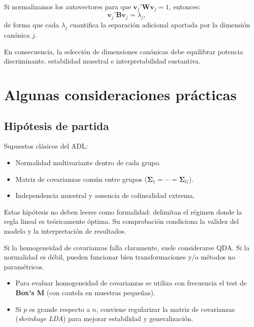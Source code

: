 \documentclass[12pt, a4paper]{article}
\theoremstyle{plain}
\theoremstyle{definition}
\theoremstyle{remark}
\newcommand{\mat}[1]{\mathbf{#1}}
\begin{document}
Si normalizamos los autovectores para que
$\mathbf{v}_j'\mat{W}\mathbf{v}_j=1$, entonces:
\[
  \mathbf{v}_j'\mat{B}\mathbf{v}_j=\lambda_j,
\]
de forma que cada $\lambda_j$ cuantifica la separación adicional aportada
por la dimensión canónica $j$.

En consecuencia, la selección de dimensiones canónicas debe equilibrar potencia
discriminante, estabilidad muestral e interpretabilidad sustantiva.

\section{Algunas consideraciones prácticas}

\subsection{Hipótesis de partida}

Supuestos clásicos del ADL:
\begin{itemize}
  \item Normalidad multivariante dentro de cada grupo.
  \item Matriz de covarianzas común entre grupos
        ($\boldsymbol{\Sigma}_1=\cdots=\boldsymbol{\Sigma}_G$).
  \item Independencia muestral y ausencia de colinealidad extrema.
\end{itemize}

Estas hipótesis no deben leerse como formalidad: delimitan el régimen donde la
regla lineal es teóricamente óptima. Su comprobación condiciona la validez del
modelo y la interpretación de resultados.

Si la homogeneidad de covarianzas falla claramente, suele considerarse QDA.
Si la normalidad es débil, pueden funcionar bien transformaciones y/o métodos
no paramétricos.

\begin{itemize}
  \item Para evaluar homogeneidad de covarianzas se utiliza con frecuencia el
        test de \textbf{Box's M} (con cautela en muestras pequeñas).
  \item Si $p$ es grande respecto a $n$, conviene regularizar la matriz de
        covarianzas (\emph{shrinkage LDA}) para mejorar estabilidad y
        generalización.
\end{itemize}
\end{document}
